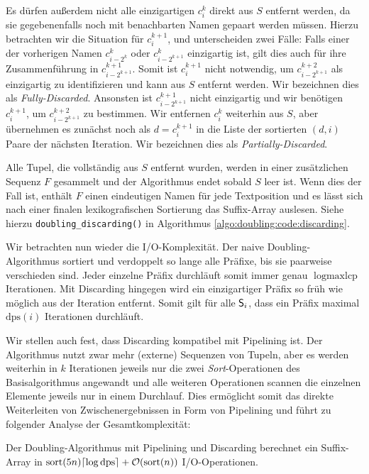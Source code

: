 Es dürfen außerdem nicht alle einzigartigen $c_i^k$ direkt aus $S$ entfernt werden, da sie gegebenenfalls noch mit benachbarten Namen gepaart werden müssen. Hierzu betrachten wir die Situation für $c_i^{k+1}$, und unterscheiden zwei Fälle: Falls einer der vorherigen Namen $c_{i - 2^k}^k$ oder $c_{i - 2^{k+1}}^k$ einzigartig ist, gilt dies auch für ihre Zusammenführung in $c_{i - 2^{k+1}}^{k+1}$. Somit ist $c_i^{k+1}$ nicht notwendig, um $c_{i - 2^{k+1}}^{k+2}$ als einzigartig zu identifizieren und kann aus $S$ entfernt werden. Wir bezeichnen dies als \textit{Fully-Discarded}. Ansonsten ist $c_{i - 2^{k+1}}^{k+1}$ nicht einzigartig und wir benötigen $c_i^{k+1}$, um $c_{i - 2^{k+1}}^{k+2}$ zu bestimmen. Wir entfernen $c_i^k$ weiterhin aus $S$, aber übernehmen es zunächst noch als $d = c_i^{k+1}$ in die Liste der sortierten $(d, i)$ Paare der nächsten Iteration. Wir bezeichnen dies als \textit{Partially-Discarded}.

Alle Tupel, die vollständig aus $S$ entfernt wurden, werden in einer zusätzlichen Sequenz $F$ gesammelt und der Algorithmus endet sobald $S$ leer ist. Wenn dies der Fall ist, enthält $F$ einen eindeutigen Namen für jede Textposition und es lässt sich nach einer finalen lexikografischen Sortierung das Suffix-Array auslesen. Siehe hierzu \texttt{doubling\_discarding()} in Algorithmus \ref{algo:doubling:code:discarding}.

Wir betrachten nun wieder die I/O-Komplexität. Der naive Doubling-Algorithmus sortiert und verdoppelt so lange alle Präfixe, bis sie paarweise verschieden sind. Jeder einzelne Präfix durchläuft somit immer genau $\log \text{maxlcp}$ Iterationen. Mit Discarding hingegen wird ein einzigartiger Präfix so früh wie möglich aus der Iteration entfernt. Somit gilt für alle $\mathsf{S}_{i}$, dass ein Präfix maximal $\text{dps}(i)$ Iterationen durchläuft.

Wir stellen auch fest, dass Discarding kompatibel mit Pipelining ist. Der Algorithmus nutzt zwar mehr (externe) Sequenzen von Tupeln, aber es werden weiterhin in $k$ Iterationen jeweils nur die zwei \textit{Sort}-Operationen des Basisalgorithmus angewandt und alle weiteren Operationen scannen die einzelnen Elemente jeweils nur in einem Durchlauf. Dies ermöglicht somit das direkte Weiterleiten von Zwischenergebnissen in Form von Pipelining und führt zu folgender Analyse der Gesamtkomplexität:

\begin{theorem}
Der Doubling-Algorithmus mit Pipelining und Discarding berechnet ein Suffix-Array in $\text{sort}(5n) \ceil*{\log \text{dps}} +  \mathcal{O}(\text{sort}(n))$ I/O-Operationen.
\end{theorem}

